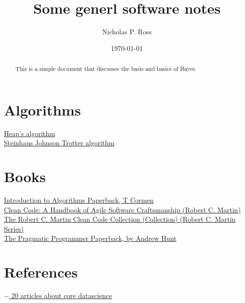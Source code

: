 \documentclass[11pt]{article}
\begin{document}
\title{Some generl software notes}
\author{Nicholas P. Ross}
\date{\today}
\maketitle


\begin{abstract}
This is a simple document that discusses the basis and basics of Bayes. 
\end{abstract}


\tableofcontents


\newpage



\section{Algorithms}

\href{https://en.wikipedia.org/wiki/Heap\%27s_algorithm}{Heap's algorithm}\\
\href{https://en.wikipedia.org/wiki/Steinhaus%E2%80%93Johnson%E2%80%93Trotter_algorithm}{Steinhaus Johnson Trotter algorithm}


\section{Books}
\href{https://www.amazon.co.uk/Introduction-Algorithms-T-Cormen/dp/0262533057}{Introduction to Algorithms Paperback, T Cormen}\\
\href{https://www.amazon.co.uk/Clean-Code-Handbook-Software-Craftsmanship/dp/0132350882/}{Clean Code: A Handbook of Agile Software Craftsmanship (Robert C. Martin)}\\
\href{https://www.amazon.co.uk/Robert-Martin-Clean-Code-Collection-ebook/dp/B00666M59G}{The Robert C. Martin Clean Code Collection (Collection) (Robert C. Martin Series)}\\
\href{https://www.amazon.co.uk/Pragmatic-Programmer-Andrew-Hunt/dp/020161622X}{The Pragmatic Programmer Paperback, by Andrew Hunt}\\



\section{References}
\href{http://www.datasciencecentral.com/profiles/blogs/20-articles-about-core-data-science}{$-$ 20 articles about core datascience}\\
\end{document}
